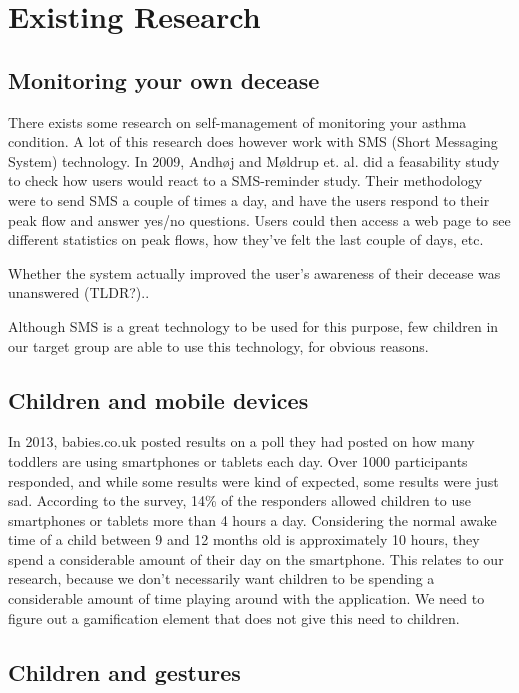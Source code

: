 \section{Existing Research}
\label{sec:existing-research}

\subsection{Monitoring your own decease}
There exists some research on self-management of monitoring your asthma condition. A lot of this research does however work with SMS (Short Messaging System) technology. In 2009, Andh\o j and M\o ldrup et. al.\cite{anhoj2004feasibility} did a feasability study to check how users would react to a SMS-reminder study. Their methodology were to send SMS a couple of times a day, and have the users respond to their peak flow and answer yes/no questions. Users could then access a web page to see different statistics on peak flows, how they've felt the last couple of days, etc.


Whether the system actually improved the user's awareness of their decease was unanswered (TLDR?).. 

Although SMS is a great technology to be used for this purpose, few children in our target group are able to use this technology, for obvious reasons. 

\subsection{Children and mobile devices}
In 2013, babies.co.uk posted results on a poll they had posted on how many toddlers are using smartphones or tablets each day\cite{babiesusageoftablets}. Over 1000 participants responded, and while some results were kind of expected, some results were just sad. According to the survey, 14\% of the responders allowed children to use smartphones or tablets more than 4 hours a day. Considering the normal awake time of a child between 9 and 12 months old is approximately 10 hours, they spend a considerable amount of their day on the smartphone. This relates to our research, because we don't necessarily want children to be spending a considerable amount of time playing around with the application. We need to figure out a gamification element that does not give this need to children.        


\subsection{Children and gestures}

